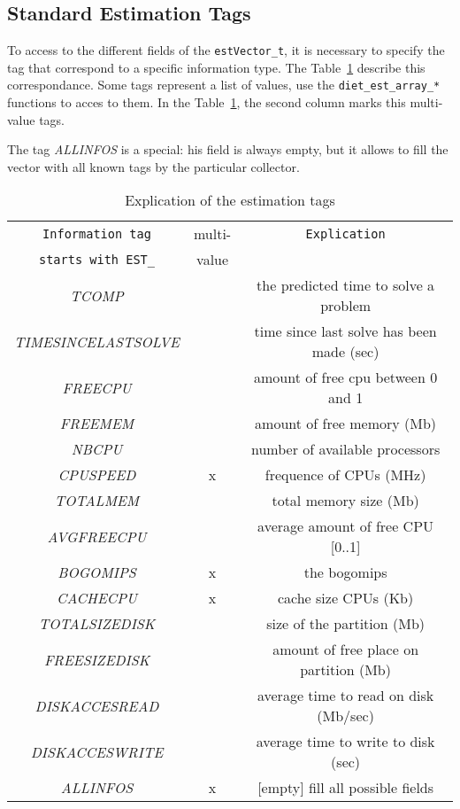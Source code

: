 \subsection{Standard Estimation Tags}\label{sect:estTags}

To access to the different fields of the \texttt{estVector\_t}, it
is necessary to specify the tag that correspond to a specific information type.
The Table~\ref{t:tags} describe this correspondance.
Some tags represent a list of values, use the \texttt{diet\_est\_array\_*} 
functions to acces to them. In the Table~\ref{t:tags}, 
the second column marks this multi-value tags.

The tag \textit{ALLINFOS} is a special: his field is 
always empty, but it allows to fill the vector with all known tags 
by the particular collector.
 
\begin{table}[h]
 \footnotesize
 \centering
 \begin{tabular}[c]{|c|c|c|}\hline

  \texttt{Information tag}  &multi-& \texttt{Explication} \\[5pt]
 \texttt{starts with EST\_} &value& \\[5pt]
  \hline

 \textit{TCOMP        }&& the predicted time 
                       to solve a problem \\[5pt]
  \textit{TIMESINCELASTSOLVE} &   & time since last solve has been made (sec) \\[5pt]
  \hline
  \textit{FREECPU      }&& amount of free cpu between 0 and 1 \\[5pt]
  \hline
  \textit{FREEMEM      }&& amount of free  memory (Mb) \\[5pt]
  \hline
  \textit{NBCPU        }&& number of available processors  \\[5pt]
  \hline
  \textit{CPUSPEED     }&x& frequence of CPUs (MHz) \\[5pt]
  \hline
  \textit{TOTALMEM     }&& total memory size (Mb)  \\[5pt]
  \hline
  \textit{AVGFREECPU   }&& average amount of free CPU [0..1] \\[5pt]
  \hline
  \textit{BOGOMIPS     }&x& the bogomips \\[5pt]
  \hline
  \textit{CACHECPU     }&x& cache size CPUs (Kb) \\[5pt]
  \hline
  \textit{TOTALSIZEDISK}&& size of the partition (Mb)\\[5pt]
  \hline
  \textit{FREESIZEDISK }&& amount of free place on partition (Mb)\\[5pt]
  \hline
  \textit{DISKACCESREAD}&& average time to read on disk (Mb/sec) \\[5pt]
  \hline
  \textit{DISKACCESWRITE}&& average time to write to disk (sec) \\[5pt]
  \hline
  \textit{ALLINFOS     }&x& [empty] fill all possible fields \\[5pt]
  \hline
 \end{tabular}
 \caption{Explication of the estimation tags}
 \label{t:tags}
\end{table}

